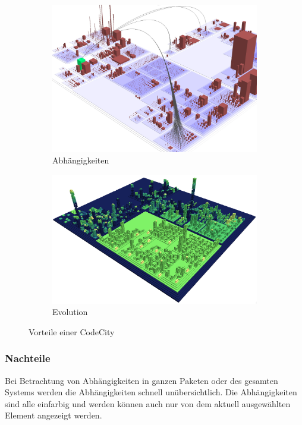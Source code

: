 \setlength{\fwidth}{.49\textwidth}
\begin{figure}[htbp]
	\centering
	\begin{subfigure}[b]{0.9\fwidth}
		\centering
		\includegraphics[width=\linewidth]{figures/code-city-access}
		\caption{Abhängigkeiten} \label{fig:code-city-access}
	\end{subfigure}
	\hfill
	\begin{subfigure}[b]{\fwidth}
		\centering
		\includegraphics[width=\linewidth]{figures/code-city-evolution}
		\caption{Evolution \cite{wettel2008Visual}} \label{fig:code-city-evolution}
	\end{subfigure}
	\caption{Vorteile einer CodeCity} \label{fig:code-city-advantages}
\end{figure}

\subsubsection*{Nachteile}
Bei Betrachtung von Abhängigkeiten in ganzen Paketen oder des gesamten Systems werden die Abhängigkeiten schnell unübersichtlich. Die Abhängigkeiten sind alle einfarbig und werden können auch nur von dem aktuell ausgewählten Element angezeigt werden.

